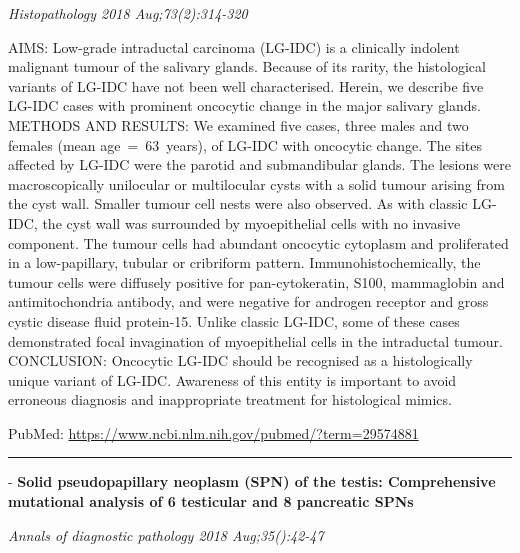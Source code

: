 \documentclass[]{article}
\begin{document}
\emph{Histopathology 2018 Aug;73(2):314-320}

AIMS: Low-grade intraductal carcinoma (LG-IDC) is a clinically indolent
malignant tumour of the salivary glands. Because of its rarity, the
histological variants of LG-IDC have not been well characterised.
Herein, we describe five LG-IDC cases with prominent oncocytic change in
the major salivary glands. METHODS AND RESULTS: We examined five cases,
three males and two females (mean age~=~63~years), of LG-IDC with
oncocytic change. The sites affected by LG-IDC were the parotid and
submandibular glands. The lesions were macroscopically unilocular or
multilocular cysts with a solid tumour arising from the cyst wall.
Smaller tumour cell nests were also observed. As with classic LG-IDC,
the cyst wall was surrounded by myoepithelial cells with no invasive
component. The tumour cells had abundant oncocytic cytoplasm and
proliferated in a low-papillary, tubular or cribriform pattern.
Immunohistochemically, the tumour cells were diffusely positive for
pan-cytokeratin, S100, mammaglobin and antimitochondria antibody, and
were negative for androgen receptor and gross cystic disease fluid
protein-15. Unlike classic LG-IDC, some of these cases demonstrated
focal invagination of myoepithelial cells in the intraductal tumour.
CONCLUSION: Oncocytic LG-IDC should be recognised as a histologically
unique variant of LG-IDC. Awareness of this entity is important to avoid
erroneous diagnosis and inappropriate treatment for histological mimics.

PubMed: \url{https://www.ncbi.nlm.nih.gov/pubmed/?term=29574881}

{}

{}

\begin{center}\rule{0.5\linewidth}{\linethickness}\end{center}

 - \textbf{Solid pseudopapillary neoplasm (SPN) of the testis:
Comprehensive mutational analysis of 6 testicular and 8 pancreatic SPNs}

\emph{Annals of diagnostic pathology 2018 Aug;35():42-47}
\end{document}
